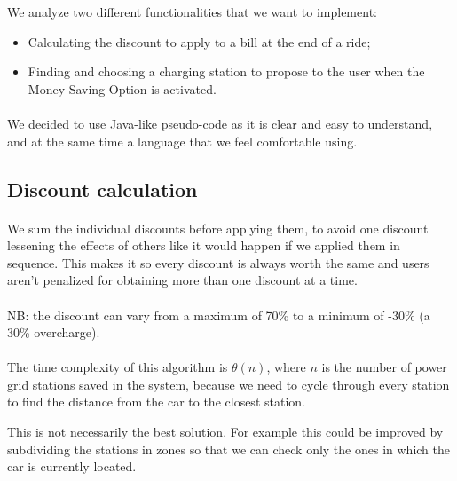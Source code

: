 \documentclass[english]{article}
\begin{document}
We analyze two different functionalities that we want to implement:
\begin{itemize}
	\item{Calculating the discount to apply to a bill at the end of a ride;}
	\item{Finding and choosing a charging station to propose to the user when the Money Saving Option is activated.}
\end{itemize}

\paragraph{}
We decided to use Java-like pseudo-code as it is clear and easy to understand, and at the same time a language that we feel comfortable using.

\subsection{Discount calculation}



\paragraph{}
We sum the individual discounts before applying them, to avoid one discount lessening the effects of others like it would happen if we applied them in sequence. This makes it so every discount is always worth the same and users aren't penalized for obtaining more than one discount at a time.

\paragraph{}
NB: the discount can vary from a maximum of 70\% to a minimum of -30\% (a 30\% overcharge).

\paragraph{}
The time complexity of this algorithm is $\theta(n)$, where $n$ is the number of power grid stations saved in the system, because we need to cycle through every station to find the distance from the car to the closest station.

This is not necessarily the best solution. For example this could be improved by subdividing the stations in zones so that we can check only the ones in which the car is currently located.
\end{document}
